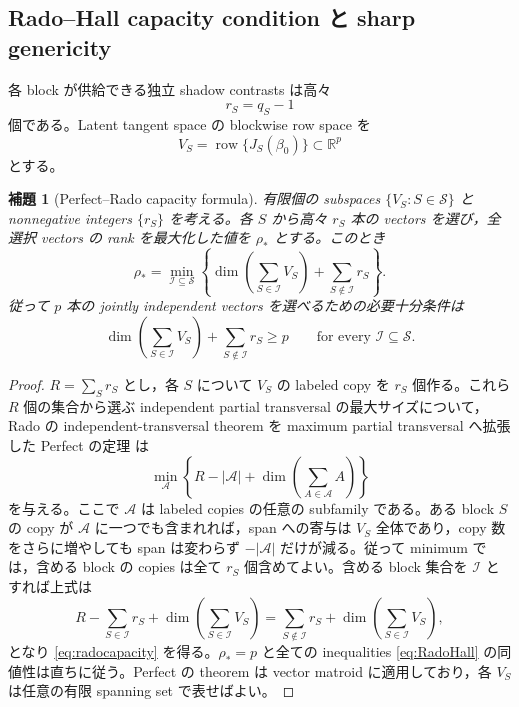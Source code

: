 \documentclass[11pt,a4paper]{ltjsarticle}
\newtheorem{lemma}{補題}[section]
\theoremstyle{remark}
\newcommand{\R}{\mathbb R}
\newcommand{\cS}{\mathcal S}
\newcommand{\row}{\operatorname{row}}
\begin{document}
\subsection{Rado--Hall capacity condition と sharp genericity}
各 block が供給できる独立 shadow contrasts は高々
\[
r_S=q_S-1
\]
個である。Latent tangent space の blockwise row space を
\[
V_S=\row\{J_S(\beta_0)\}\subset\R^p
\]
とする。

\begin{lemma}[Perfect--Rado capacity formula]\label{lem:radoedmonds}
有限個の subspaces $\{V_S:S\in\cS\}$ と nonnegative integers $\{r_S\}$ を考える。各 $S$ から高々 $r_S$ 本の vectors を選び，全選択 vectors の rank を最大化した値を $\rho_*$ とする。このとき
\begin{equation}
\rho_*
=\min_{\mathcal I\subseteq\cS}
\left\{
\dim\left(\sum_{S\in\mathcal I}V_S\right)
+\sum_{S\notin\mathcal I}r_S
\right\}.
\label{eq:radocapacity}
\end{equation}
従って $p$ 本の jointly independent vectors を選べるための必要十分条件は
\begin{equation}
\dim\left(\sum_{S\in\mathcal I}V_S\right)
+\sum_{S\notin\mathcal I}r_S
\ge p
\qquad
\text{for every }\mathcal I\subseteq\cS.
\label{eq:RadoHall}
\end{equation}
\end{lemma}

\begin{proof}
$R=\sum_Sr_S$ とし，各 $S$ について $V_S$ の labeled copy を $r_S$ 個作る。これら $R$ 個の集合から選ぶ independent partial transversal の最大サイズについて，Rado の independent-transversal theorem \cite{Rado1942} を maximum partial transversal へ拡張した Perfect の定理 \cite{Perfect1969} は
\[
\min_{\mathcal A}
\left\{R-|\mathcal A|
+\dim\left(\sum_{A\in\mathcal A}A\right)
\right\}
\]
を与える。ここで $\mathcal A$ は labeled copies の任意の subfamily である。ある block $S$ の copy が $\mathcal A$ に一つでも含まれれば，span への寄与は $V_S$ 全体であり，copy 数をさらに増やしても span は変わらず $-|\mathcal A|$ だけが減る。従って minimum では，含める block の copies は全て $r_S$ 個含めてよい。含める block 集合を $\mathcal I$ とすれば上式は
\[
R-\sum_{S\in\mathcal I}r_S
+\dim\left(\sum_{S\in\mathcal I}V_S\right)
=
\sum_{S\notin\mathcal I}r_S
+\dim\left(\sum_{S\in\mathcal I}V_S\right),
\]
となり \eqref{eq:radocapacity} を得る。$\rho_*=p$ と全ての inequalities \eqref{eq:RadoHall} の同値性は直ちに従う。Perfect の theorem は vector matroid に適用しており，各 $V_S$ は任意の有限 spanning set で表せばよい。
\end{proof}
\end{document}
